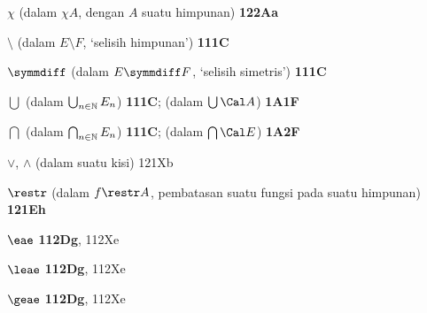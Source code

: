 \indexmedskip
\indexheader{$\scriptstyle\pmb{\chi}$}

$\chi$ (dalam $\chi A$, dengan $A$ suatu himpunan) {\bf 122Aa}






\indexheader{$\scriptstyle\pmb{\omega}$}


































\indexmedskip
{}

$\setminus$ (dalam $E\setminus F$, `selisih himpunan') {\bf 111C}

$\symmdiff$ (dalam $E\symmdiff F$, `selisih simetris') {\bf 111C}







$\bigcup$ (dalam $\bigcup_{n\in\Bbb N}E_n$) {\bf 111C};
  (dalam $\bigcup\Cal A$) {\bf 1A1F}

$\bigcap$ (dalam $\bigcap_{n\in\Bbb N}E_n$) {\bf 111C};
  (dalam $\bigcap\Cal E$) {\bf 1A2F}

$\vee$, $\wedge$ (dalam suatu kisi) 121Xb





$\restr$ (dalam $f\restr A$, pembatasan suatu fungsi pada suatu himpunan) {\bf
121Eh}





$\eae$ {\bf 112Dg}, 112Xe

$\leae$ {\bf 112Dg}, 112Xe

$\geae$ {\bf 112Dg}, 112Xe






























